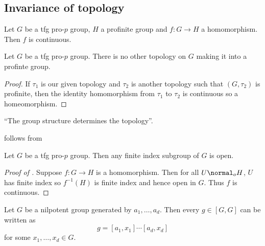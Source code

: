 \documentclass[a4paper]{article}
\begin{document}
\subsection{Invariance of topology}

\begin{theorem}
  \label{thm:homomorphism from pro-p group is continuous}
  Let \(G\) be a tfg pro-\(p\) group, \(H\) a profinite group and \(f: G \to H\) a homomorphism. Then \(f\) is continuous.
\end{theorem}

\begin{corollary}
  Let \(G\) be a tfg pro-\(p\) group. There is no other topology on \(G\) making it into a profinte group.
\end{corollary}

\begin{proof}
  If \(\tau_1\) is our given topology and \(\tau_2\) is another topology such that \((G, \tau_2)\) is profinite, then the identity homomorphism from \(\tau_1\) to \(\tau_2\) is continuous so a homeomorphism.
\end{proof}

``The group structure determines the topology''.

 follows from

\begin{theorem}
  \label{thm:finite index subgroup of pro-p group is open}
  Let \(G\) be a tfg pro-\(p\) group. Then any finite index subgroup of \(G\) is open.
\end{theorem}

\begin{proof}[Proof of ]
  Suppose \(f: G \to H\) is a homomorphism. Then for all \(U \normal_o H\), \(U\) has finite index so \(f^{-1}(H)\) is finite index and hence open in \(G\). Thus \(f\) is continuous.
\end{proof}

\begin{lemma}
  Let \(G\) be a nilpotent group generated by \(a_1, \dots, a_d\). Then every \(g \in [G, G]\) can be written as
  \[
    g = [a_1, x_1] \cdots [a_d, x_d]
  \]
  for some \(x_1, \dots, x_d \in G\).
\end{lemma}
\end{document}
